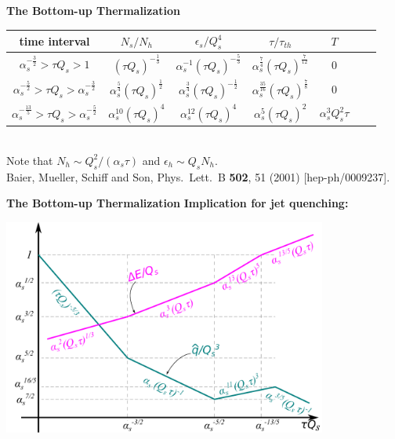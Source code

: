 \documentclass[9pt,a4paper,unknownkeysallowed,xcolor=dvipsnames,aspectratio=43]{beamer}
\begin{document}
\begin{frame}{\bf\huge The Bottom-up Thermalization}
\begin{center}
\begin{tabular}{ c|| c c c c c c}
\hline
time interval&$N_s/N_h$ & $\epsilon_s/Q_s^4$ & $\tau/\tau_{th}$ & $T$\\
\hline\hline
 $ \alpha_s^{-\frac{3}{2}}> \tau Q_s > 1$ 
 & $(\tau Q_s)^{-\frac{1}{3}}$ 
 & $\alpha_{s}^{-1} (\tau Q_s)^{-\frac{5}{3}}$
 & $\alpha_{s}^{\frac{7}{4}} (\tau Q_s)^{\frac{7}{12}}$
 &0\\
 \hline
 $ \alpha_s^{-\frac{5}{2}}> \tau Q_s > \alpha_s^{-\frac{3}{2}}$ 
 & $\alpha_{s}^{\frac{5}{4}} (\tau Q_s)^{\frac{1}{2}}$
 & $\alpha_{s}^{\frac{3}{4}}(\tau Q_s)^{-\frac{1}{2}}$
 & $\alpha_{s}^{\frac{35}{16}} (\tau Q_s)^{\frac{7}{8}}$
 &0\\
  \hline
 $ \alpha_s^{-\frac{13}{5}}> \tau Q_s > \alpha_s^{-\frac{5}{2}}$ 
 & $\alpha_{s}^{10} (\tau Q_s)^{4}$
 & $\alpha_{s}^{12} (\tau Q_s)^{4}$ 
 & $ \alpha_{s}^{5} (\tau Q_s)^{2}$
 & $ \alpha_{s}^{3} Q_{s}^{2} \tau$\\
 \hline
\end{tabular}\\
\vspace{2mm}
{\small Note that $N_h \sim Q_s^2/(\alpha_s\tau)$ and $\epsilon_h\sim Q_s N_h$.}\\
\vspace{2mm}
    {\tiny  {\color{teablue}
  Baier, Mueller, Schiff and Son,
  Phys.\ Lett.\ B {\bf 502}, 51 (2001)
  [hep-ph/0009237].
}}
\end{center}
\end{frame}
%
%
\begin{frame}{\bf\huge The Bottom-up Thermalization}	\vspace{2mm}
{\large\bf Implication for jet quenching:}
\vspace{2mm}
\begin{center}
\includegraphics[width=0.8\textwidth]{fig/qhatInBottomUp}\end{center}
\end{frame}
\end{document}
